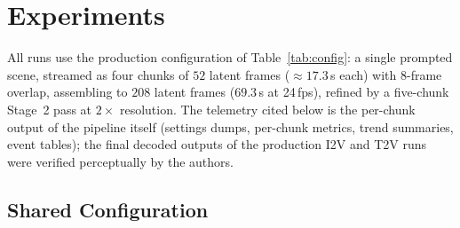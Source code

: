 \documentclass[12pt]{article}
\begin{document}
\section{Experiments}
\label{sec:experiments}

All runs use the production configuration of Table~\ref{tab:config}: a
single prompted scene, streamed as four chunks of $52$ latent frames
($\approx17.3$\,s each) with $8$-frame overlap, assembling to $208$ latent
frames ($69.3$\,s at 24\,fps), refined by a five-chunk Stage~2 pass at
$2\times$ resolution.  The telemetry cited below is the per-chunk output of
the pipeline itself (settings dumps, per-chunk metrics, trend summaries,
event tables); the final decoded outputs of the production I2V and T2V runs
were verified perceptually by the authors.
\label{sec:telemetry}

\subsection{Shared Configuration}
\end{document}
